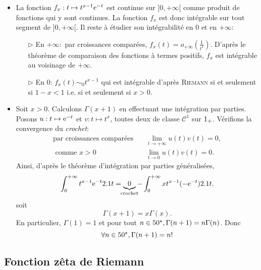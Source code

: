 \begin{demo}
    \begin{itemize}
        \item La fonction $f_x:t \mapsto t^{x-1} \mathrm{e}^{-t}$ est continue sur $]0, + \infty[$ comme produit de fonctions qui y sont continues. La fonction $f_x$ est donc intégrable sur tout segment de $]0, +\infty[$. Il reste à étudier son intégrabilité en $0$ et en $+ \infty$:
        \begin{itemize}
            \item[$\triangleright$] En $+\infty:$ par croissances comparées, $f_x(t) = o_{+\infty} \left(\frac{1}{t^2} \right)$. D'après le théorème de comparaison des fonctions à termes positifs, $f_x$ est intégrable au voisinage de $+\infty$.
            \item[$\triangleright$] En $0$: $f_x(t) \sim_0 t^{x-1}$ qui est intégrable d'après \textsc{Riemann} si et seulement si $1-x < 1$ i.e. si et seulement si $x > 0$.
        \end{itemize}

        \item Soit $x > 0$. Calculons $\Gamma(x+1)$ en effectuant une intégration par parties. Posons $u:t \mapsto \mathrm{e}^{-t}$ et $v:t \mapsto t^x$, toutes deux de classe $\mathscr{C}^1$ sur $1_+$. Vérifions la convergence du \emph{crochet}:
        \begin{align*}
            \text{par croissances comparées} \quad & \lim_{t \to +\infty} u(t) v(t) = 0, \\
            \text{ comme } x > 0 \quad & \lim_{t \to 0} u(t) v(t) = 0.
        \end{align*}
        Ainsi, d'après le théorème d'intégration par parties généralisées, 
        $$\int_{0}^{+\infty} t^{x-1} \e^{-t} \d t = \underbrace{0}_{\mathclap{\text{crochet}}} - \int_{0}^{+\infty} xt^{x-1} (-\e^{-t}) \d t.$$
        soit 
        $$\Gamma(x+1) = x \Gamma(x).$$
        En particulier, $\Gamma(1) = 1$ et pour tout $n \in 50^\star, \Gamma(n+1) = n \Gamma(n)$. Donc
        $$\forall n \in 50^\star, \Gamma(n+1) = n!$$
    \end{itemize}
\end{demo}


\subsection{Fonction zêta de Riemann}\label{subsec:fonctionZeta}


